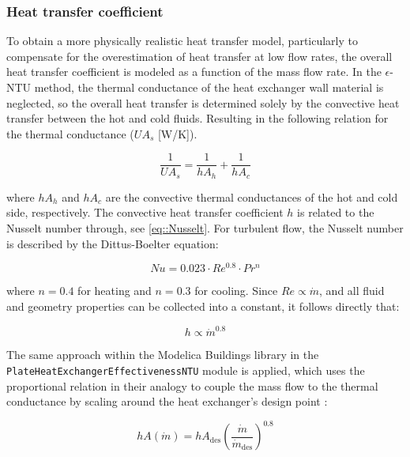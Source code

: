\subsubsection{Heat transfer coefficient}
To obtain a more physically realistic heat transfer model, particularly to compensate for the overestimation of heat transfer at low flow rates, the overall heat transfer coefficient is modeled as a function of the mass flow rate. In the $\epsilon$-NTU method, the thermal conductance of the heat exchanger wall material is neglected, so the overall heat transfer is determined solely by the convective heat transfer between the hot and cold fluids. Resulting in the following relation for the thermal conductance ($UA_s$ [W/K]).

\begin{equation}
    \frac{1}{UA_s} = \frac{1}{hA_h} + \frac{1}{hA_c}
    \label{eq:UA_series}
\end{equation}

\noindent where $hA_h$ and $hA_c$ are the convective thermal conductances of the hot and cold side, respectively. The convective heat transfer coefficient $h$ is related to the Nusselt number through, see \ref{eq::Nusselt}. For turbulent flow, the Nusselt number is described by the Dittus-Boelter equation:

\begin{equation}
    Nu = 0.023 \cdot Re^{0.8} \cdot Pr^{n}
    \label{eq:dittus_boelter}
\end{equation}

\noindent where $n = 0.4$ for heating and $n = 0.3$ for cooling. Since $Re \propto \dot{m}$, and all fluid and geometry properties can be collected into a constant, it follows directly that:

\begin{equation}
    h \propto \dot{m}^{0.8}
    \label{eq:h_scaling}
\end{equation}

The same approach within the Modelica Buildings library in the \texttt{PlateHeatExchangerEffectivenessNTU} module is applied, which uses the proportional relation in their analogy to couple the mass flow to the thermal conductance by scaling around the heat exchanger's design point \cite{BuildingsLibrary}:

\begin{equation}
    hA(\dot{m}) = hA_{\text{des}} \left(\frac{\dot{m}}{\dot{m}_{\text{des}}}\right)^{0.8}
    \label{eq:hA_scaling}
\end{equation}

